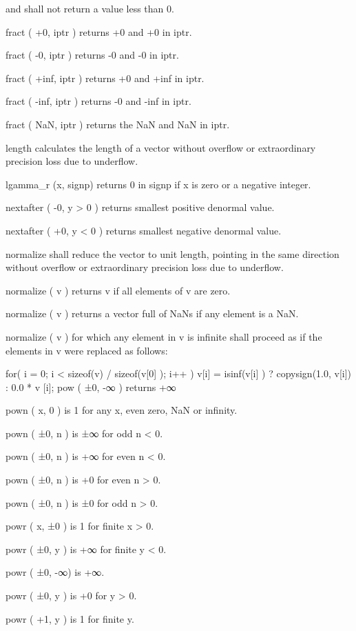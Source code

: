 and shall not return a value less than 0.\par
\blank
fract ( +0, iptr ) returns +0 and +0 in iptr.\par
fract ( -0, iptr ) returns -0 and -0 in iptr.\par
fract ( +inf, iptr ) returns +0 and +inf in iptr.\par
fract ( -inf, iptr ) returns -0 and -inf in iptr.\par
fract ( NaN, iptr ) returns the NaN and NaN in iptr.\par
\blank
length calculates the length of a vector without overflow or extraordinary precision loss
due to underflow.\par
\blank
lgamma_r (x, signp) returns 0 in signp if x is zero or a negative integer.\par
\blank
nextafter ( -0, y > 0 ) returns smallest positive denormal value.\par
nextafter ( +0, y < 0 ) returns smallest negative denormal value.\par
\blank
normalize shall reduce the vector to unit length, pointing in the same direction without
overflow or extraordinary precision loss due to underflow.\par
normalize ( v ) returns v if all elements of v are zero.\par
normalize ( v ) returns a vector full of NaNs if any element is a NaN.\par
normalize ( v ) for which any element in v is infinite shall proceed as if the elements in v
were replaced as follows:\par
\startclc
for( i = 0; i < sizeof(v) / sizeof(v[0] ); i++ )
	v[i] = isinf(v[i] ) ? copysign(1.0, v[i]) : 0.0 * v [i];
\stopclc
\blank
pow ( ±0, -∞ ) returns +∞\par
\blank
pown ( x, 0 ) is 1 for any x, even zero, NaN or infinity.\par
pown ( ±0, n ) is ±∞ for odd n < 0.\par
pown ( ±0, n ) is +∞ for even n < 0.\par
pown ( ±0, n ) is +0 for even n > 0.\par
pown ( ±0, n ) is ±0 for odd n > 0.\par
\blank
powr ( x, ±0 ) is 1 for finite x > 0.\par
powr ( ±0, y ) is +∞ for finite y < 0.\par
powr ( ±0, -∞) is +∞.\par
powr ( ±0, y ) is +0 for y > 0.\par
powr ( +1, y ) is 1 for finite y.\par
